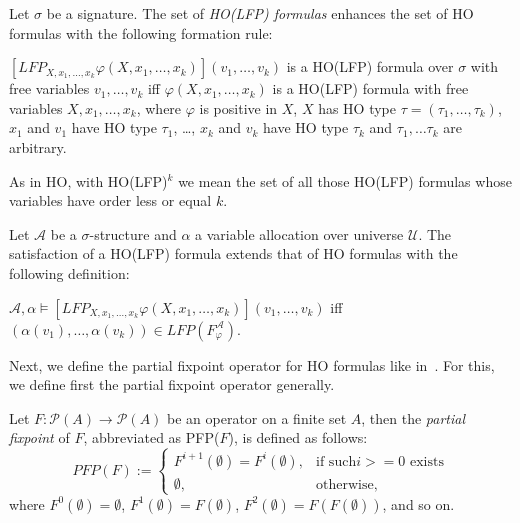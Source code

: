 \begin{definition}
    Let $\sigma$ be a signature. The set of \emph{HO(LFP) formulas} enhances the set of HO formulas with the
    following formation rule:
    \begin{compactitem}
        \item $[LFP_{X, x_1, \dots, x_k}\varphi(X, x_1, \dots, x_k)](v_1, \dots, v_k)$ is a HO(LFP) formula over
        $\sigma$ with free variables $v_1, \dots, v_k$ iff $\varphi(X, x_1, \dots, x_k)$ is a HO(LFP) formula with
        free variables $X, x_1, \dots, x_k$, where $\varphi$ is positive in $X$, $X$ has HO type $\tau = (\tau_1,
        \dots, \tau_k)$, $x_1$ and $v_1$ have HO type $\tau_1$, \dots, $x_k$ and $v_k$ have HO type $\tau_k$ and
        $\tau_1, \dots \tau_k$ are arbitrary.
    \end{compactitem}
\end{definition}

As in HO, with HO(LFP)$^k$ we mean the set of all those HO(LFP) formulas whose variables have order less or equal $k$.

\begin{definition}
    Let $\mathcal{A}$ be a $\sigma$-structure and $\alpha$ a variable allocation over universe $\mathcal{U}$. The
    satisfaction of a HO(LFP) formula extends that of HO formulas with the following definition:
    \begin{compactitem}
        \item $\mathcal{A}, \alpha \models [LFP_{X, x_1, \dots, x_k}\varphi(X, x_1, \dots, x_k)](v_1, \dots, v_k)$
        iff $(\alpha(v_1), \dots, \alpha(v_k)) \in LFP(F_\varphi^\mathcal{A})$.
    \end{compactitem}
\end{definition}

Next, we define the partial fixpoint operator for HO formulas like in~\cite{schewe2006fixpoint}. For this, we define
first the partial fixpoint operator generally.

\begin{definition}
    Let $F: \mathscr{P}(A) \rightarrow \mathscr{P}(A)$ be an operator on a finite set $A$, then the \emph{partial
    fixpoint} of $F$, abbreviated as PFP($F$), is defined as follows:
    \[PFP(F):=\begin{cases}
               F^{i+1}(\emptyset)=F^i(\emptyset),  & \text{if such} i >= 0 \text{ exists}\\
               \emptyset, & \text{otherwise,}
    \end{cases}\]
    where $F^0(\emptyset) = \emptyset$, $F^1(\emptyset) = F(\emptyset)$, $F^2(\emptyset) = F(F(\emptyset))$, and so on.
\end{definition}

